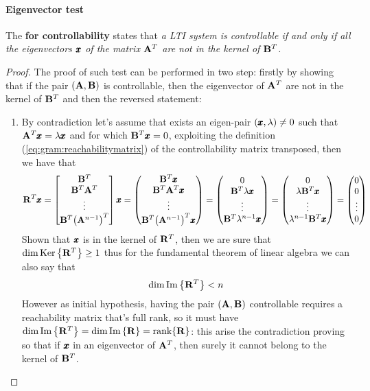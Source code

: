 	\paragraph{Eigenvector test} The  \textbf{for controllability} states that {\itshape a LTI system is controllable if and only if all the eigenvectors $\pmb{x}$ of the matrix $\mathbf{A}^T$ are not in the kernel of $\mathbf{B}^T$.}
	\begin{proof}
		The proof of such test can be performed in two step: firstly by showing that if the pair $(\mathbf{A},\mathbf{B})$ is controllable, then the eigenvector of $\mathbf{A}^T$ are not in the kernel of $\mathbf{B}^T$ and then the reversed statement:
		\begin{enumerate}[\itshape a)]
			\item By contradiction let's assume that exists an eigen-pair $(\pmb{x},\lambda) \neq 0$ such that $\mathbf{A}^T \pmb{x} = \lambda \pmb{x}$ and for which $\mathbf{B}^T\pmb{x} = 0$, exploiting the definition (\ref{eq:gram:reachabilitymatrix}) of the controllability matrix transposed, then we have that
			\[ \mathbf{R}^T \pmb{x} = \begin{bmatrix} \mathbf{B}^T \\ \mathbf{B}^T\mathbf{A}^T \\ \vdots \\ \mathbf{B}^T \big(\mathbf{A}^{n-1}\big)^T \end{bmatrix} \pmb{x} = \begin{pmatrix} \mathbf{B}^T\pmb{x} \\ \mathbf{B}^T\mathbf{A}^T\pmb{x} \\ \vdots \\ \mathbf{B}^T \big(\mathbf{A}^{n-1}\big)^T\pmb{x} \end{pmatrix} = \begin{pmatrix} 0 \\ \mathbf{B}^T \lambda \pmb{x} \\ \vdots \\ \mathbf{B}^T \lambda^{n-1} \pmb{x} \end{pmatrix} = \begin{pmatrix} 0 \\ \lambda \mathbf{B}^T\pmb{x} \\ \vdots \\ \lambda^{n-1} \mathbf{B}^T \pmb{x} \end{pmatrix} = \begin{pmatrix} 0\\0\\ \vdots \\ 0 \end{pmatrix} \]
			Shown that $\pmb{x}$ is in the kernel of $\mathbf{R}^T$, then we are sure that $\dim \textrm{Ker}\left\{\mathbf{R}^T\right\} \geq 1$ thus for the fundamental theorem of linear algebra we can also say that
			\[ \dim \textrm{Im}\left\{\mathbf{R}^T\right\} < n \]
			However as initial hypothesis, having the pair $(\mathbf{A},\mathbf{B})$ controllable requires a reachability matrix that's full rank, so it must have $\dim \textrm{Im}\left\{\mathbf{R}^T\right\} = \dim \textrm{Im}\left\{\mathbf{R}\right\} = \textrm{rank}\{\mathbf{R}\}$: this arise the contradiction proving so that if $\pmb{x}$ in an eigenvector of $\mathbf{A}^T$, then surely it cannot belong to the kernel of $\mathbf{B}^T$.
			

\end{enumerate}
\end{proof}
